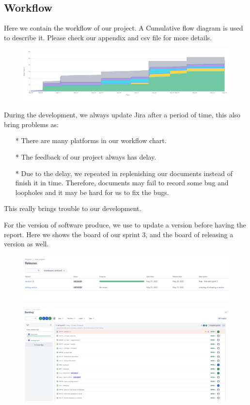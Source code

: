 \documentclass[
]{dtuposter}
\begin{document}
\begin{dtupostercontent}
\section{Workflow}
Here we contain the workflow of our project. A Cumulative flow diagram is used to describe it. Please check our appendix and csv file for more details. 
\begin{figure}
    \centering\includegraphics[width=1\linewidth,origin=c]{external/figure/burndownchart.png}
\end{figure}
During the development, we always update Jira after a period of time, this also bring problems as:
\begin{itemize}
    \item [*] There are many platforms in our workflow chart.
    \item [*] The feedback of our project always has delay.
    \item [*] Due to the delay, we repeated in replenishing our documents instead of finish it in time. Therefore, documents may fail to record some bug and loopholes and it may be hard for us to fix the bugs.
\end{itemize}
This really brings trouble to our development. 
\par For the version of software produce, we use to update a version before having the report. Here we shows the board of our sprint 3, and the board of releasing a version as well.
\begin{figure}
    \centering\includegraphics[width=1\linewidth,origin=c]{external/figure/versionrelease.png}
\end{figure}
\begin{figure}
    \centering\includegraphics[width=1\linewidth,origin=c]{external/figure/sprint3.png}

\end{figure}
\end{dtupostercontent}
\end{document}
